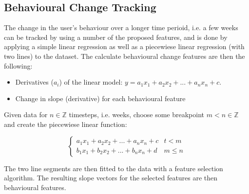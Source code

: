 \subsection{Behavioural Change Tracking}
The change in the user's behaviour over a longer time perioid, i.e. a few weeks can be tracked by using a number of the proposed features, and is done by applying a simple linear regression as well as a piecewiese linear regression (with two lines) to the dataset. The calculate behavioural change features are then the following:

\begin{itemize}
    \item Derivatives ($a_i$) of the linear model: $y=a_1 x_1 + a_2 x_2 + ... + a_n x_n + c$.
    \item Change in slope (derivative) for each behavioural feature
\end{itemize}

Given data for $n \in \mathbb{Z}$ timesteps, i.e. weeks, choose some breakpoint $m < n \in \mathbb{Z}$ and create the piecewiese linear function:

\[ \begin{cases} 
      a_1 x_1 + a_2 x_2 + ... + a_n x_n + c & t <    m \\
      b_1 x_1 + b_2 x_2 + ... + b_n x_n + d & m \leq n 
   \end{cases}
\]

The two line segments are then fitted to the data with a feature selection algorithm. The resulting slope vectors for the selected features are then behavioural features.


